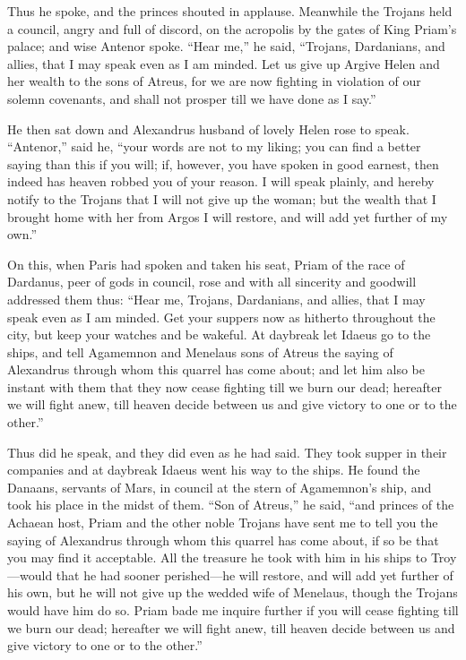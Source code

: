 Thus he spoke, and the princes shouted in applause. Meanwhile the Trojans
held a council, angry and full of discord, on the acropolis by the gates
of King Priam’s palace; and wise Antenor spoke. “Hear me,” he said,
“Trojans, Dardanians, and allies, that I may speak even as I am minded.
Let us give up Argive Helen and her wealth to the sons of Atreus, for we
are now fighting in violation of our solemn covenants, and shall not
prosper till we have done as I say.”

He then sat down and Alexandrus husband of lovely Helen rose to speak.
“Antenor,” said he, “your words are not to my liking; you can find a
better saying than this if you will; if, however, you have spoken in good
earnest, then indeed has heaven robbed you of your reason. I will speak
plainly, and hereby notify to the Trojans that I will not give up the
woman; but the wealth that I brought home with her from Argos I will
restore, and will add yet further of my own.”

On this, when Paris had spoken and taken his seat, Priam of the race of
Dardanus, peer of gods in council, rose and with all sincerity and
goodwill addressed them thus: “Hear me, Trojans, Dardanians, and allies,
that I may speak even as I am minded. Get your suppers now as hitherto
throughout the city, but keep your watches and be wakeful. At daybreak let
Idaeus go to the ships, and tell Agamemnon and Menelaus sons of Atreus the
saying of Alexandrus through whom this quarrel has come about; and let him
also be instant with them that they now cease fighting till we burn our
dead; hereafter we will fight anew, till heaven decide between us and give
victory to one or to the other.”

Thus did he speak, and they did even as he had said. They took supper in
their companies and at daybreak Idaeus went his way to the ships. He found
the Danaans, servants of Mars, in council at the stern of Agamemnon’s
ship, and took his place in the midst of them. “Son of Atreus,” he said,
“and princes of the Achaean host, Priam and the other noble Trojans have
sent me to tell you the saying of Alexandrus through whom this quarrel has
come about, if so be that you may find it acceptable. All the treasure he
took with him in his ships to Troy—would that he had sooner perished—he
will restore, and will add yet further of his own, but he will not give up
the wedded wife of Menelaus, though the Trojans would have him do so.
Priam bade me inquire further if you will cease fighting till we burn our
dead; hereafter we will fight anew, till heaven decide between us and give
victory to one or to the other.”

